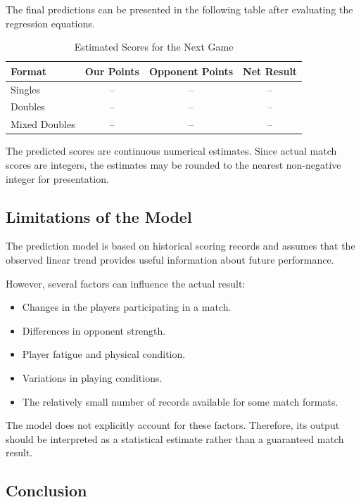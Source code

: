 The final predictions can be presented in the
following table after evaluating the regression
equations.

\begin{table}[H]
\centering
\caption{Estimated Scores for the Next Game}
\begin{tabular}{lccc}
\toprule
\textbf{Format} &
\textbf{Our Points} &
\textbf{Opponent Points} &
\textbf{Net Result} \\
\midrule
Singles & -- & -- & -- \\
Doubles & -- & -- & -- \\
Mixed Doubles & -- & -- & -- \\
\bottomrule
\end{tabular}
\end{table}

The predicted scores are continuous numerical
estimates. Since actual match scores are integers,
the estimates may be rounded to the nearest
non-negative integer for presentation.

\subsection{Limitations of the Model}

The prediction model is based on historical scoring
records and assumes that the observed linear trend
provides useful information about future performance.

However, several factors can influence the actual
result:

\begin{itemize}
    \item Changes in the players participating in
    a match.
    \item Differences in opponent strength.
    \item Player fatigue and physical condition.
    \item Variations in playing conditions.
    \item The relatively small number of records
    available for some match formats.
\end{itemize}

The model does not explicitly account for these
factors. Therefore, its output should be interpreted
as a statistical estimate rather than a guaranteed
match result.

\subsection{Conclusion}


